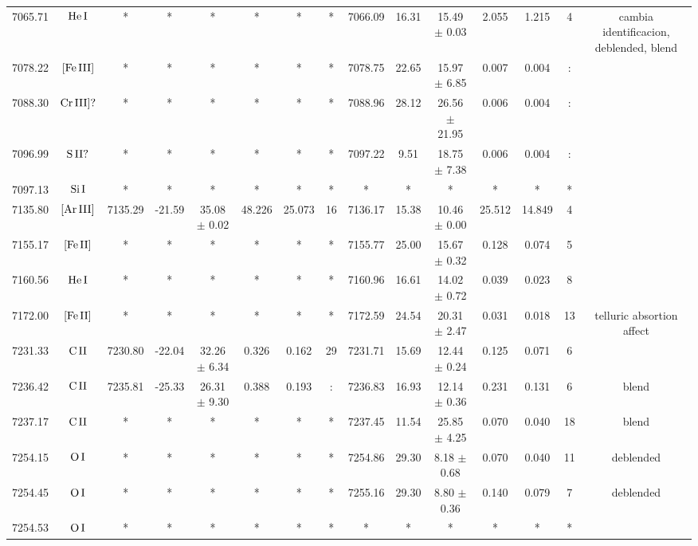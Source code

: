 \documentclass{article}
\begin{document}
\begin{table*}
\begin{adjustbox}{width=\textwidth}
\begin{tabular}{ccccccccccccccc}
7065.71 & $\mbox{He}\thinspace \mbox{I}$ & * & * & * & * & * & * & 7066.09 & 16.31 & 15.49 $\pm$ 0.03 & 2.055 & 1.215 & 4 &  cambia identificacion, deblended, blend \\
7078.22 & $\mbox{[Fe}\thinspace \mbox{III]}$ & * & * & * & * & * & * & 7078.75 & 22.65 & 15.97 $\pm$ 6.85 & 0.007 & 0.004 & : &  \\
7088.30 & $\mbox{Cr}\thinspace \mbox{III]?}$ & * & * & * & * & * & * & 7088.96 & 28.12 & 26.56 $\pm$ 21.95 & 0.006 & 0.004 & : &  \\
7096.99 & $\mbox{S}\thinspace \mbox{II?}$ & * & * & * & * & * & * & 7097.22 & 9.51 & 18.75 $\pm$ 7.38 & 0.006 & 0.004 & : &  \\
7097.13 & $\mbox{Si}\thinspace \mbox{I}$ & * & * & * & * & * & * & * & * & * & * & * & * &  \\
7135.80 & $\mbox{[Ar}\thinspace \mbox{III]}$ & 7135.29 & -21.59 & 35.08 $\pm$ 0.02 & 48.226 & 25.073 & 16 & 7136.17 & 15.38 & 10.46 $\pm$ 0.00 & 25.512 & 14.849 & 4 &  \\
7155.17 & $\mbox{[Fe}\thinspace \mbox{II]}$ & * & * & * & * & * & * & 7155.77 & 25.00 & 15.67 $\pm$ 0.32 & 0.128 & 0.074 & 5 &  \\
7160.56 & $\mbox{He}\thinspace \mbox{I}$ & * & * & * & * & * & * & 7160.96 & 16.61 & 14.02 $\pm$ 0.72 & 0.039 & 0.023 & 8 &  \\
7172.00 & $\mbox{[Fe}\thinspace \mbox{II]}$ & * & * & * & * & * & * & 7172.59 & 24.54 & 20.31 $\pm$ 2.47 & 0.031 & 0.018 & 13 &  telluric absortion affect \\
7231.33 & $\mbox{C}\thinspace \mbox{II}$ & 7230.80 & -22.04 & 32.26 $\pm$ 6.34 & 0.326 & 0.162 & 29 & 7231.71 & 15.69 & 12.44 $\pm$ 0.24 & 0.125 & 0.071 & 6 &  \\
7236.42 & $\mbox{C}\thinspace \mbox{II}$ & 7235.81 & -25.33 & 26.31 $\pm$ 9.30 & 0.388 & 0.193 & : & 7236.83 & 16.93 & 12.14 $\pm$ 0.36 & 0.231 & 0.131 & 6 &  blend \\
7237.17 & $\mbox{C}\thinspace \mbox{II}$ & * & * & * & * & * & * & 7237.45 & 11.54 & 25.85 $\pm$ 4.25 & 0.070 & 0.040 & 18 &  blend \\
7254.15 & $\mbox{O}\thinspace \mbox{I}$ & * & * & * & * & * & * & 7254.86 & 29.30 & 8.18 $\pm$ 0.68 & 0.070 & 0.040 & 11 &  deblended \\
7254.45 & $\mbox{O}\thinspace \mbox{I}$ & * & * & * & * & * & * & 7255.16 & 29.30 & 8.80 $\pm$ 0.36 & 0.140 & 0.079 & 7 &  deblended \\
7254.53 & $\mbox{O}\thinspace \mbox{I}$ & * & * & * & * & * & * & * & * & * & * & * & * &  \\

\end{tabular}
\end{adjustbox}
\end{table*}
\end{document}
